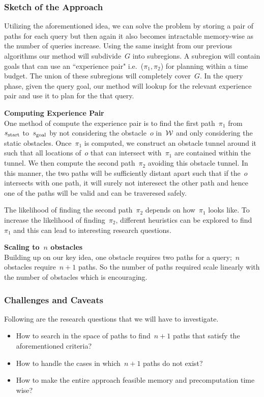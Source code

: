 \documentclass[a4paper,10pt]{article}
\begin{document}
\subsubsection{Sketch of the Approach}
Utilizing the aforementioned idea, we can solve the problem by storing a pair of paths for each query but then again it also becomes intractable memory-wise as the number of queries increase. Using the same insight from our previous algorithms our method will subdivide~$G$ into subregions.  A subregion will contain goals that can use an ``experience pair" i.e.~($\pi_1,\pi_2$) for planning within a time budget. The union of these subregions will completely cover~$G$. In the query phase, given the query goal, our method will lookup for the relevant experience pair and use it to plan for the that query.

\textbf{Computing Experience Pair}\\
One method of compute the experience pair is to find the first path~$\pi_1$ from~$s_{\text{start}}$ to~$s_{\text{goal}}$ by not considering the obstacle~$o$ in~$\mathcal{W}$ and only considering the static obstacles. Once~$\pi_1$ is computed, we construct an obstacle tunnel around it such that all locations of~$o$ that can intersect with~$\pi_1$ are contained within the tunnel. We then compute the second path~$\pi_2$ avoiding this obstacle tunnel. In this manner, the two paths will be sufficiently distant apart such that if the~$o$ intersects with one path, it will surely not interesect the other path and hence one of the paths will be valid and can be traveresed safely.

The likelihood of finding the second path~$\pi_2$ depends on how~$\pi_1$ looks like. To increase the likelihood of finding~$\pi_2$, different heuristics can be explored to find~$\pi_1$ and this can lead to interesting research questions.

\textbf{Scaling to~$n$ obstacles}\\
Building up on our key idea, one obstacle requires two paths for a query;~$n$ obstacles require~$n+1$ paths. So the number of paths required scale linearly with the number of obstacles which is encouraging.

\subsubsection{Challenges and Caveats}
Following are the research questions that we will have to investigate.
\begin{itemize}
\item How to search in the space of paths to find~$n+1$ paths that satisfy the aforementioned criteria?
\item How to handle the cases in which~$n+1$ paths do not exist?
\item How to make the entire approach feasible memory and precomputation time wise?
\end{itemize}
\end{document}
